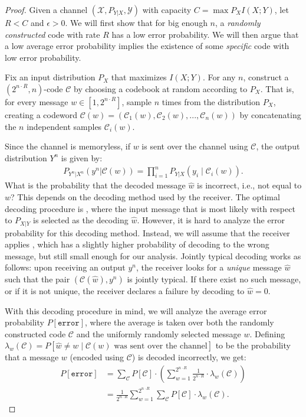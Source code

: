 \begin{proof}
\newcommand{\cran}{\ensuremath{\mathcal{C}}\xspace}
\newcommand{\xran}{\ensuremath{\mathcal{C}}\xspace}
\newcommand{\cspec}{\ensuremath{\mathcal{C}^*}\xspace}
\newcommand{\error}{\texttt{error}}
Given a channel $(\mathcal{X},P_{Y|X},\mathcal{Y})$ with capacity $C = \max{P_X} I(X;Y)$, let $R < C$ and $\epsilon > 0$. We will first show that for big enough $n$, a \emph{randomly constructed} code with rate $R$ has a low error probability. We will then argue that a low average error probability implies the existence of some \emph{specific} code with low error probability.

Fix an input distribution $P_X$ that maximizes $I(X;Y)$. For any $n$, construct a $(2^{n \cdot R},n)$-code \cran by choosing a codebook at random according to $P_X$. That is, for every message $w \in [1,2^{n \cdot R}]$, sample $n$ times from the distribution $P_X$, creating a codeword $\cran(w) = (\xran_1(w), \xran_2(w), ..., \xran_n(w))$ by concatenating the $n$ independent samples $\xran_i(w)$.

Since the channel is memoryless, if $w$ is sent over the channel using \cran, the output distribution $Y^n$ is given by:
\begin{align}
P_{Y^n|X^n}(y^n|\cran(w)) = \prod_{i=1}^n P_{Y|X} (y_i \mid \xran_i(w)).
\end{align}
What is the probability that the decoded message $\hat{w}$ is incorrect, i.e., not equal to $w$? This depends on the decoding method used by the receiver. The optimal decoding procedure is , where the input message that is most likely with respect to $P_{X|Y}$ is selected as the decoding $\hat{w}$. However, it is hard to analyze the error probability for this decoding method. Instead, we will assume that the receiver applies , which has a slightly higher probability of decoding to the wrong message, but still small enough for our analysis. Jointly typical decoding works as follows: upon receiving an output $y^n$, the receiver looks for a \emph{unique} message $\hat{w}$ such that the pair $(\cran(\hat{w}),y^n)$ is jointly typical. If there exist no such message, or if it is not unique, the receiver declares a failure by decoding to $\hat{w} = 0$.

With this decoding procedure in mind, we will analyze the average error probability $P[\error]$, where the average is taken over both the randomly constructed code \cran and the uniformly randomly selected message $w$. Defining $\lambda_w(\cran) = P[\hat{w} \neq w \mid \cran(w) \text{ was sent over the channel}]$ to be the probability that a message $w$ (encoded using $\cran$) is decoded incorrectly, we get:
\begin{align}
P[\error] &= \sum_{\cran} P[\cran] \cdot \left(\sum_{w=1}^{2^{n\cdot R}} \frac{1}{2^{n \cdot R}} \cdot \lambda_w(\cran) \right)\nonumber\\
&= \frac{1}{2^{n \cdot R}} \sum_{w = 1}^{2^{n \cdot R}} \sum_{\cran} P[\cran] \cdot \lambda_w(\cran).\label{eq:prob-error}
\end{align}


\end{proof}
